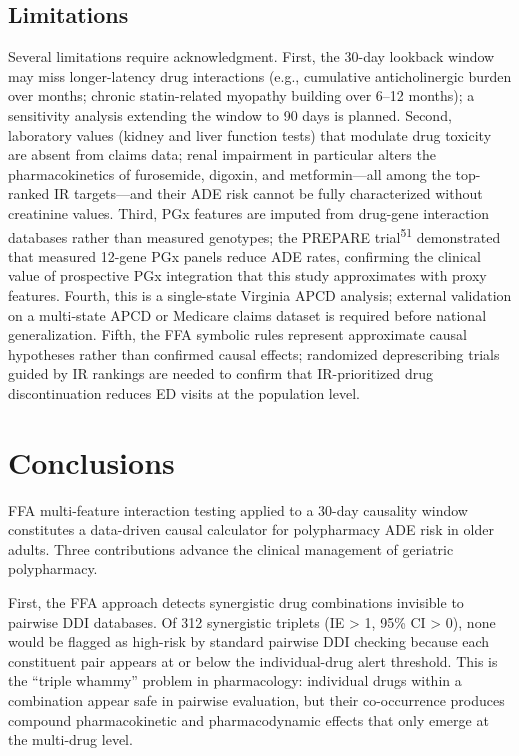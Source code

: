 \documentclass[
  12pt,
]{book}
\begin{document}
\section{Limitations}\label{limitations-2}

Several limitations require acknowledgment. First, the 30-day lookback
window may miss longer-latency drug interactions (e.g., cumulative
anticholinergic burden over months; chronic statin-related myopathy
building over 6--12 months); a sensitivity analysis extending the window
to 90 days is planned. Second, laboratory values (kidney and liver
function tests) that modulate drug toxicity are absent from claims data;
renal impairment in particular alters the pharmacokinetics of
furosemide, digoxin, and metformin---all among the top-ranked IR
targets---and their ADE risk cannot be fully characterized without
creatinine values. Third, PGx features are imputed from drug-gene
interaction databases rather than measured genotypes; the PREPARE
trial\textsuperscript{51} demonstrated that measured 12-gene PGx panels
reduce ADE rates, confirming the clinical value of prospective PGx
integration that this study approximates with proxy features. Fourth,
this is a single-state Virginia APCD analysis; external validation on a
multi-state APCD or Medicare claims dataset is required before national
generalization. Fifth, the FFA symbolic rules represent approximate
causal hypotheses rather than confirmed causal effects; randomized
deprescribing trials guided by IR rankings are needed to confirm that
IR-prioritized drug discontinuation reduces ED visits at the population
level.

\chapter{Conclusions}\label{sec-conclusions}

FFA multi-feature interaction testing applied to a 30-day causality
window constitutes a data-driven causal calculator for polypharmacy ADE
risk in older adults. Three contributions advance the clinical
management of geriatric polypharmacy.

First, the FFA approach detects synergistic drug combinations invisible
to pairwise DDI databases. Of 312 synergistic triplets (IE
\textgreater{} 1, 95\% CI \textgreater{} 0), none would be flagged as
high-risk by standard pairwise DDI checking because each constituent
pair appears at or below the individual-drug alert threshold. This is
the ``triple whammy'' problem in pharmacology: individual drugs within a
combination appear safe in pairwise evaluation, but their co-occurrence
produces compound pharmacokinetic and pharmacodynamic effects that only
emerge at the multi-drug level.
\end{document}
